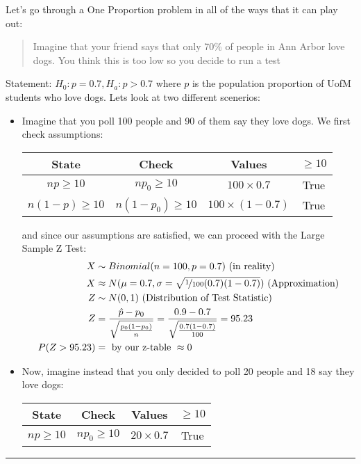 \documentclass[landscape]{article}
\newcommand{\myline}{\vspace{4pt}\hrule  \vspace{4pt}}
\newenvironment{topic}[1]{
	\noindent \textbf{\textsc{\color{harvardcrimson}{#1}}}
	\noindent \hspace{-3.5pt}
}{
	\myline
}
\newenvironment{compactitem}{
	\begin{itemize}[leftmargin=*,labelsep=5pt]
	}{
	\end{itemize}
}
\begin{document}
\begin{multicols*}{3}
	\begin{topic}{One Proportion Test Assumptions}
		Let's go through a One Proportion problem in all of the ways that it can play out:
		\begin{quote}
			Imagine that your friend says that only 70\% of people in Ann Arbor love dogs. You think this is too low so you decide to run a test
		\end{quote}
		Statement: $ H_0: p = 0.7, H_a: p > 0.7 $ where $ p $ is the population proportion of UofM students who love dogs. Lets look at two different scenerios:
	
		\begin{compactitem}
			\item Imagine that you poll 100 people and 90 of them say they love dogs. We first check assumptions:
			\begin{center}
				\begin{tabular}{cccc}
					State & Check & Values & $ \geq 10 $ \\
					\midrule
					$ np \geq 10 $    &    $ np_0 \geq 10 $   &    $ 100 \times 0.7 $    &      True      \\
					$ n(1-p) \geq 10 $    &    $ n(1-p_0) \geq 10 $   &     $ 100 \times (1-0.7) $   & True
				\end{tabular}
			\end{center}
			and since our assumptions are satisfied, we can proceed with the Large Sample Z Test:
			\begin{align*}
			X &\sim Binomial(n = 100, p = 0.7) \text{ (in reality)}\\
			X &\approx N(\mu = 0.7, \sigma = \sqrt{\nicefrac{1}{100} (0.7)(1-0.7)}) \text{ (Approximation)}\\
			Z &\sim N(0,1) \text{ (Distribution of Test Statistic)}\\
			Z &= \frac{\hat{p} - p_0}{\sqrt{\frac{p_0(1- p_0)}{n}}} = \frac{0.9 - 0.7}{\sqrt{\frac{0.7(1-0.7)}{100}}} = 95.23\\
			P(Z > 95.23) &= \text{ by our z-table } \approx 0 
			\end{align*}
			\item Now, imagine instead that you only decided to poll 20 people and 18 say they love dogs:
			\begin{center}
				\begin{tabular}{cccc}
					State & Check & Values & $ \geq 10 $ \\
					\midrule
					$ np \geq 10 $    &    $ np_0 \geq 10 $   &    $ 20 \times 0.7 $    &      True      \\

\end{tabular}
\end{center}
\end{compactitem}
\end{topic}
\end{multicols*}
\end{document}
